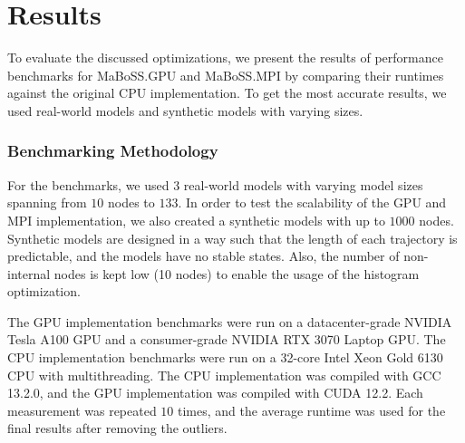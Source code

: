 \documentclass[times, twoside]{zHenriquesLab-StyleBioRxiv}
\begin{document}


\section*{Results}

To evaluate the discussed optimizations, we present the results of performance benchmarks for MaBoSS.GPU and MaBoSS.MPI by comparing their runtimes against the original CPU implementation. To get the most accurate results, we used real-world models and synthetic models with varying sizes.

\subsubsection*{Benchmarking Methodology}

For the benchmarks, we used $3$ real-world models with varying model sizes spanning from $10$ nodes to $133$. In order to test the scalability of the GPU and MPI implementation, we also created a synthetic models with up to $1000$ nodes. Synthetic models are designed in a way such that the length of each trajectory is predictable, and the models have no stable states. Also, the number of non-internal nodes is kept low (10 nodes) to enable the usage of the histogram optimization.

The GPU implementation benchmarks were run on a datacenter-grade NVIDIA Tesla A100 GPU and a consumer-grade NVIDIA RTX 3070 Laptop GPU. The CPU implementation benchmarks were run on a 32-core Intel Xeon Gold 6130 CPU with multithreading. The CPU implementation was compiled with GCC 13.2.0, and the GPU implementation was compiled with CUDA 12.2. Each measurement was repeated $10$ times, and the average runtime was used for the final results after removing the outliers.
\end{document}
